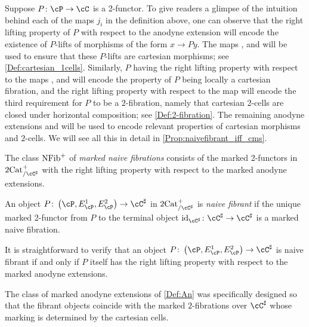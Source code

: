 \documentclass[11pt, dvipsnames]{amsart}
\begin{document}
		\begin{rmk}
			Suppose $P\colon\cP \to \cC$ is a 2-functor. To give readers a glimpse of the intuition behind each of the maps $j_i$ in the definition above, one can observe that the right lifting property of $P$ with respect to the anodyne extension  will encode the existence of $P$-lifts of morphisms of the form $x \to Py$. The maps ,  and  will be used to ensure that these $P$-lifts are cartesian morphisms; see \cref{Def:cartesian_1cells}. Similarly, $P$ having the right lifting property with respect to the maps ,  and  will encode the property of $P$ being locally a cartesian fibration, and the right lifting property with respect to the map  will encode the third requirement for $P$ to be a $2$-fibration, namely that cartesian $2$-cells are closed under horizontal composition; see \cref{Def:2-fibration}. The remaining anodyne extensions  and  will be used to encode relevant properties of cartesian morphisms and $2$-cells. We will see all this in detail in \cref{Prop:naivefibrant_iff_cms}.
		\end{rmk}

		\begin{defn}\label{Def:Naivefibrations}
			The class $\mathrm{NFib}^{+}$ of \emph{marked naive fibrations} consists of the marked 2-functors in  $\twocat^{+}_{/\cC^\sharp}$ with the right lifting property with respect to the marked anodyne extensions.
            
            An object $P\colon \markedscat{\cP}\to\cC^\sharp$ in $\twocat^{+}_{/\cC^\sharp}$ is \emph{naive fibrant} if the unique marked 2-functor from $P$ to the terminal object $\id_{{\cC^{\sharp}}}\colon\cC^{\sharp}\to\cC^{\sharp}$ is a marked naive fibration.
		\end{defn}

        \begin{rmk}
            It is straightforward to verify that an object $P\colon \markedscat{\cP}\to\cC^\sharp$ is naive fibrant if and only if $P$ itself has the right lifting property with respect to the marked anodyne extensions.
        \end{rmk}

        The class of marked anodyne extensions of \cref{Def:An} was specifically designed so that the fibrant objects coincide with the marked $2$-fibrations over $\cC^\sharp$ whose marking is determined by the cartesian cells. 
\end{document}
